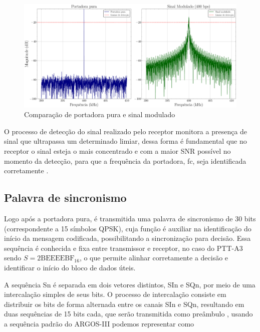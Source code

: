 \begin{figure}[H]
	\centering
	\caption{Comparação de portadora pura e sinal modulado}\label{fig:portadora_pura_freq}
	\includegraphics[width=\linewidth]{assets/plots/carrier_spectra.pdf}
\end{figure}

O processo de detecção do sinal realizado pelo receptor monitora a presença de sinal que ultrapassa um determinado limiar, dessa forma é fundamental que no receptor o sinal esteja o mais concentrado e com a maior \gls{SNR} possível no momento da detecção, para que a frequência da portadora, \gls{fc}, seja identificada corretamente \cite{cnes_services_and_message_formats_ed2_rev2_2006}.


\subsection{Palavra de sincronismo}

Logo após a portadora pura, é transmitida uma palavra de sincronismo de 30 bits (correspondente a 15 símbolos \gls{QPSK}), cuja função é auxiliar na identificação do início da mensagem codificada, possibilitando a sincronização para decisão. Essa sequência é conhecida e fixa entre transmissor e receptor, no caso do \gls{PTT-A3} sendo $S = \text{2BEEEEBF}_{16}$, o que permite alinhar corretamente a decisão e identificar o início do bloco de dados úteis. \cite{cnes_services_and_message_formats_ed2_rev2_2006}

A sequência \gls{Sn} é separada em dois vetores distintos, \gls{SIn} e \gls{SQn}, por meio de uma intercalação simples de seus bits. O processo de intercalação consiste em distribuir os bits de forma alternada entre os canais \gls{SIn} e \gls{SQn}, resultando em duas sequências de 15 bits cada, que serão transmitida como preâmbulo \cite{cnes_services_and_message_formats_ed2_rev2_2006}, usando a sequência padrão do \gls{ARGOS-III} podemos representar como

